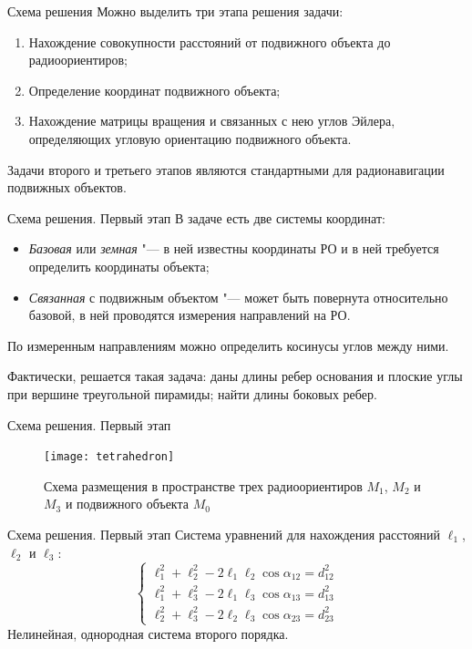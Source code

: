 \documentclass[russian,hyperref={unicode}]{beamer}
\begin{document}
  \begin{frame}{Схема решения}
    Можно выделить три этапа решения задачи:
    \begin{enumerate}
        \item Нахождение совокупности расстояний от подвижного объекта до радиоориентиров;
        \item Определение координат подвижного объекта;
        \item Нахождение матрицы вращения и связанных с нею углов Эйлера, определяющих угловую ориентацию подвижного объекта.
    \end{enumerate}
    Задачи второго и третьего этапов являются стандартными для радионавигации подвижных объектов.
  \end{frame}

  \begin{frame}{Схема решения. Первый этап}
    В задаче есть две системы координат:
    \begin{itemize}
      \item \textit{Базовая} или \textit{земная} "--- в ней известны координаты РО и в ней требуется определить координаты объекта;
      \item \textit{Связанная} с подвижным объектом "--- может быть повернута относительно базовой, в ней проводятся измерения направлений на РО.
    \end{itemize}

    По измеренным направлениям можно определить косинусы углов между ними.

    Фактически, решается такая задача: даны длины ребер основания и плоские углы при вершине треугольной пирамиды; найти длины боковых ребер.
  \end{frame}

  \begin{frame}{Схема решения. Первый этап}
    \begin{figure}
      \begin{center}
        \texttt{[image: tetrahedron]}

        \caption{Схема размещения в пространстве трех радиоориентиров $M_1$, $M_2$ и $M_3$ и подвижного объекта $M_0$}
        \label{fig:tetrahedron}
      \end{center}
    \end{figure}
  \end{frame}

  \begin{frame}{Схема решения. Первый этап}
    Система уравнений для нахождения расстояний $\ell_1$, $\ell_2$ и $\ell_3$:
    \begin{equation} \label{eq:system}
      \begin{cases}
        \ell_1^2 + \ell_2^2 - 2 \ell_1 \ell_2 \cos\alpha_{12} = d_{12}^2 \\
        \ell_1^2 + \ell_3^2 - 2 \ell_1 \ell_3 \cos\alpha_{13} = d_{13}^2 \\
        \ell_2^2 + \ell_3^2 - 2 \ell_2 \ell_3 \cos\alpha_{23} = d_{23}^2
      \end{cases}
    \end{equation}
    Нелинейная, однородная система второго порядка.
  \end{frame}
\end{document}
